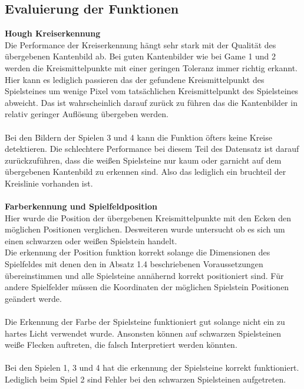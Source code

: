 \documentclass[paper=A4, deutsch]{scrartcl}
\begin{document}
\subsection{Evaluierung der Funktionen}
\textbf{Hough Kreiserkennung}\\
Die Performance der Kreiserkennung hängt sehr stark mit der Qualität des übergebenen Kantenbild ab. Bei guten Kantenbilder wie bei Game 1 und 2 werden die Kreismittelpunkte mit einer geringen Toleranz immer richtig erkannt. Hier kann es lediglich passieren das der gefundene Kreismittelpunkt des Spielsteines um wenige Pixel vom tatsächlichen Kreismittelpunkt des Spielsteines abweicht. Das ist wahrscheinlich darauf zurück zu führen das die Kantenbilder in relativ geringer Auflösung übergeben werden.\\
\\
Bei den Bildern der Spielen 3 und 4 kann die Funktion öfters keine Kreise detektieren. Die schlechtere Performance bei diesem Teil des Datensatz ist darauf zurückzuführen, dass die weißen Spielsteine nur kaum oder garnicht auf dem übergebenen Kantenbild zu erkennen sind. Also das lediglich ein bruchteil der Kreislinie vorhanden ist. \\
\\
\textbf{Farberkennung und Spielfeldposition} \\
Hier wurde die Position der übergebenen Kreismittelpunkte mit den Ecken den möglichen Positionen verglichen. Desweiteren wurde untersucht ob es sich um einen schwarzen oder weißen Spielstein handelt. \\
Die erkennung der Position funktion korrekt solange die Dimensionen des Spielfeldes mit denen den in Absatz 1.4 beschriebenen Voraussetzungen übereinstimmen und alle Spielsteine annähernd korrekt positioniert sind. Für andere Spielfelder müssen die Koordinaten der möglichen Spielstein Positionen geändert werde. \\
\\
Die Erkennung der Farbe der Spielsteine funktioniert gut solange nicht ein zu hartes Licht verwendet wurde. Ansonsten können auf schwarzen Spielsteinen weiße Flecken auftreten, die falsch Interpretiert werden könnten. \\
\\
Bei den Spielen 1, 3 und 4 hat die erkennung der Spielsteine korrekt funktioniert. Lediglich beim Spiel 2 sind Fehler bei den schwarzen Spielsteinen aufgetreten. \\
\\
\end{document}
